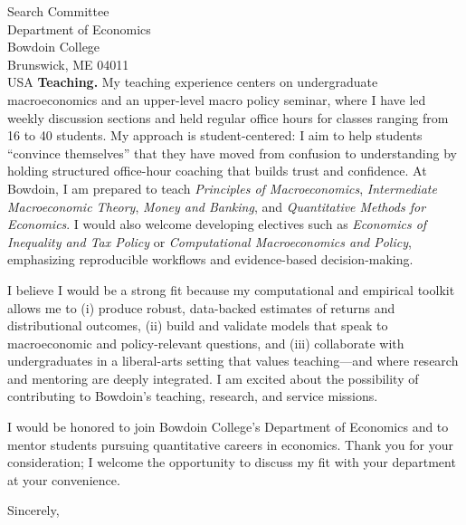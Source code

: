 \documentclass[11pt,letterpaper]{letter}
\begin{document}
\begin{letter}{Search Committee \\
Department of Economics \\
Bowdoin College \\
Brunswick, ME 04011 \\ USA}
\textbf{Teaching.} My teaching experience centers on undergraduate macroeconomics and an upper-level macro policy seminar, where I have led weekly discussion sections and held regular office hours for classes ranging from 16 to 40 students. My approach is student-centered: I aim to help students “convince themselves” that they have moved from confusion to understanding by holding structured office-hour coaching that builds trust and confidence. At Bowdoin, I am prepared to teach \textit{Principles of Macroeconomics}, \textit{Intermediate Macroeconomic Theory}, \textit{Money and Banking}, and \textit{Quantitative Methods for Economics}. I would also welcome developing electives such as \textit{Economics of Inequality and Tax Policy} or \textit{Computational Macroeconomics and Policy}, emphasizing reproducible workflows and evidence-based decision-making.

I believe I would be a strong fit because my computational and empirical toolkit allows me to (i) produce robust, data-backed estimates of returns and distributional outcomes, (ii) build and validate models that speak to macroeconomic and policy-relevant questions, and (iii) collaborate with undergraduates in a liberal-arts setting that values teaching—and where research and mentoring are deeply integrated. I am excited about the possibility of contributing to Bowdoin’s teaching, research, and service missions.

I would be honored to join Bowdoin College’s Department of Economics and to mentor students pursuing quantitative careers in economics. Thank you for your consideration; I welcome the opportunity to discuss my fit with your department at your convenience.

\closing{Sincerely,}

\end{letter}
\end{document}
